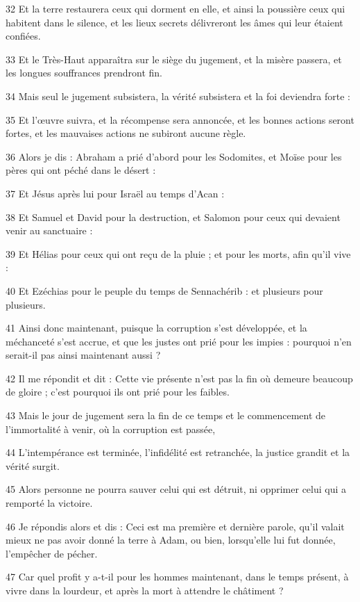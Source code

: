 \par 32 Et la terre restaurera ceux qui dorment en elle, et ainsi la poussière ceux qui habitent dans le silence, et les lieux secrets délivreront les âmes qui leur étaient confiées.
\par 33 Et le Très-Haut apparaîtra sur le siège du jugement, et la misère passera, et les longues souffrances prendront fin.
\par 34 Mais seul le jugement subsistera, la vérité subsistera et la foi deviendra forte :
\par 35 Et l'œuvre suivra, et la récompense sera annoncée, et les bonnes actions seront fortes, et les mauvaises actions ne subiront aucune règle.
\par 36 Alors je dis : Abraham a prié d'abord pour les Sodomites, et Moïse pour les pères qui ont péché dans le désert :
\par 37 Et Jésus après lui pour Israël au temps d'Acan :
\par 38 Et Samuel et David pour la destruction, et Salomon pour ceux qui devaient venir au sanctuaire :
\par 39 Et Hélias pour ceux qui ont reçu de la pluie ; et pour les morts, afin qu'il vive :
\par 40 Et Ezéchias pour le peuple du temps de Sennachérib : et plusieurs pour plusieurs.
\par 41 Ainsi donc maintenant, puisque la corruption s'est développée, et la méchanceté s'est accrue, et que les justes ont prié pour les impies : pourquoi n'en serait-il pas ainsi maintenant aussi ?
\par 42 Il me répondit et dit : Cette vie présente n'est pas la fin où demeure beaucoup de gloire ; c'est pourquoi ils ont prié pour les faibles.
\par 43 Mais le jour de jugement sera la fin de ce temps et le commencement de l'immortalité à venir, où la corruption est passée,
\par 44 L'intempérance est terminée, l'infidélité est retranchée, la justice grandit et la vérité surgit.
\par 45 Alors personne ne pourra sauver celui qui est détruit, ni opprimer celui qui a remporté la victoire.
\par 46 Je répondis alors et dis : Ceci est ma première et dernière parole, qu'il valait mieux ne pas avoir donné la terre à Adam, ou bien, lorsqu'elle lui fut donnée, l'empêcher de pécher.
\par 47 Car quel profit y a-t-il pour les hommes maintenant, dans le temps présent, à vivre dans la lourdeur, et après la mort à attendre le châtiment ?
